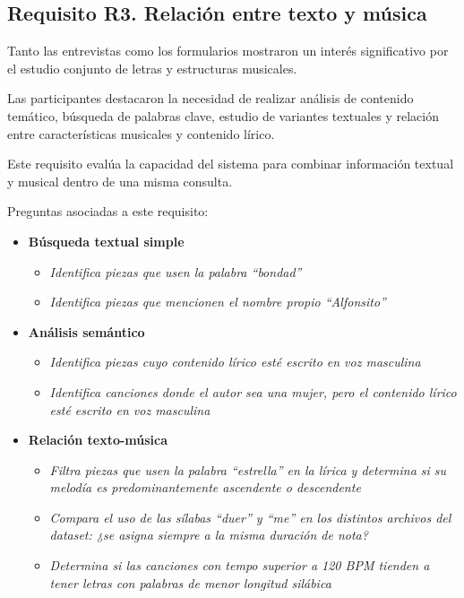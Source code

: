 \subsection{Requisito R3. Relación entre texto y música}
Tanto las entrevistas como los formularios mostraron un interés significativo por el estudio conjunto de letras y estructuras musicales.

Las participantes destacaron la necesidad de realizar análisis de contenido temático, búsqueda de palabras clave, estudio de variantes textuales y relación entre características musicales y contenido lírico.

Este requisito evalúa la capacidad del sistema para combinar información textual y musical dentro de una misma consulta.

Preguntas asociadas a este requisito:
\begin{itemize}
    \item \textbf{Búsqueda textual simple}
    \begin{itemize}
    \item \textit{Identifica piezas que usen la palabra ``bondad''}
    \item \textit{Identifica piezas que mencionen el nombre propio ``Alfonsito''}
    \end{itemize}
    \item \textbf{Análisis semántico}
    \begin{itemize}
    \item \textit{Identifica piezas cuyo contenido lírico esté escrito en voz masculina}
    \item \textit{Identifica canciones donde el autor sea una mujer, pero el contenido lírico esté escrito en voz masculina}
    \end{itemize}
    \item \textbf{Relación texto-música}
    \begin{itemize}
    \item \textit{Filtra piezas que usen la palabra ``estrella'' en la lírica y determina si su melodía es predominantemente ascendente o descendente}
    \item \textit{Compara el uso de las sílabas ``duer'' y ``me'' en los distintos archivos del dataset: ¿se asigna siempre a la misma duración de nota?}
    \item \textit{Determina si las canciones con tempo superior a 120 BPM tienden a tener letras con palabras de menor longitud silábica}
    \end{itemize}
\end{itemize}

